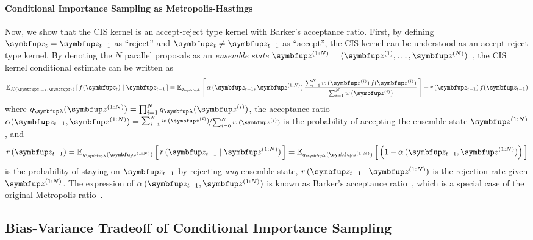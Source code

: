 \paragraph{Conditional Importance Sampling as Metropolis-Hastings}
Now, we show that the CIS kernel is an accept-reject type kernel with Barker's acceptance ratio.
First, by defining \(\vz_t = \vz_{t-1}\) as ``reject'' and \(\vz_t \neq \vz_{t-1}\) as ``accept'', the CIS kernel can be understood as an accept-reject type kernel.
By denoting the \(N\) parallel proposals as an \textit{ensemble state} \(\vz^{(1:N)} = (\vz^{(1)}, \ldots, \vz^{(N)})\)~\citep{neal_mcmc_2011a}, the CIS kernel conditional estimate can be written as
%
{%
  \begin{align}
    \Esub{K(\vz_{t-1}, \vz_t)}{f(\vz_t)\mid\vz_{t-1}}  = 
    \Esub{q_{\vlambda}}{
      \alpha\,(\vz_{t-1}, \vz^{(1:N)}) \,
      \frac{
        \sum^{N}_{i=1} w\,(\vz^{(i)})\,f(\vz^{(i)})
      }
           {
             \sum^{N}_{i=1} w\,(\vz^{(i)})
           }
    }
    + r\,(\vz_{t-1}) \, f(\vz_{t-1})\label{eq:cis_kernel}
  \end{align}
}
where \(q_{\vlambda}(\vz^{(1:N)}) = \prod^N_{i=1} q_{\vlambda}(\vz^{(i)}) \),
the acceptance ratio
\(
  \alpha(\vz_{t-1}, \vz^{(1:N)})
  = \nicefrac{\sum^{N}_{i=1} w\,(\vz^{(i)})}{\sum^{N}_{i=0} w\,(\vz^{(i)})}
\)
is the probability of accepting the ensemble state \(\vz^{(1:N)}\), and
\begin{align}
  r\,(\vz_{t-1}) = \Esub{q_{\vlambda}(\vz^{(1:N)})}{
    r\,(\vz_{t-1} \mid \vz^{(1:N)})
  }
  = \Esub{q_{\vlambda}(\vz^{(1:N)})}{
    \left(1 - \alpha\,(\vz_{t-1}, \vz^{(1:N)})\right)
  }
\end{align}
is the probability of staying on \(\vz_{t-1}\) by rejecting \textit{any} ensemble state, \(r\,(\vz_{t-1}\mid \vz^{(1:N)})\) is the rejection rate given \(\vz^{(1:N)}\).
The expression of \(\alpha\,(\vz_{t-1}, \vz^{(1:N)})\) is known as Barker's acceptance ratio~\citep{barker_monte_1965}, which is a special case of the original Metropolis ratio~\citep{metropolis_equation_1953}.


\subsection{Bias-Variance Tradeoff of Conditional Importance Sampling}\label{section:bias_variance}
